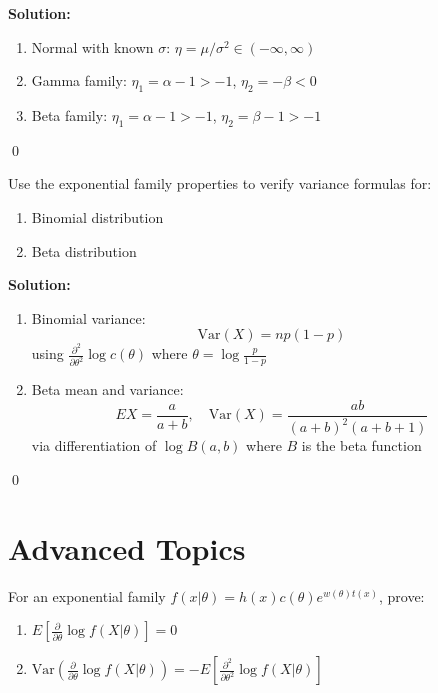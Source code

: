 \noindent\textbf{Solution:}
\begin{enumerate}[label=(\alph*)]
\item Normal with known $\sigma$: $\eta = \mu/\sigma^2 \in (-\infty,\infty)$
\item Gamma family: $\eta_1 = \alpha-1 > -1$, $\eta_2 = -\beta < 0$
\item Beta family: $\eta_1 = \alpha-1 > -1$, $\eta_2 = \beta-1 > -1$
\end{enumerate}


\qed
\begin{problembox}
Use the exponential family properties to verify variance formulas for:
\begin{enumerate}[label=(\alph*)]
\item Binomial distribution
\item Beta distribution
\end{enumerate}
\end{problembox}

\noindent\textbf{Solution:}
\begin{enumerate}[label=(\alph*)]
\item Binomial variance:
\[ \text{Var}(X) = np(1-p) \]
using $\frac{\partial^2}{\partial\theta^2}\log c(\theta)$ where $\theta = \log\frac{p}{1-p}$

\item Beta mean and variance:
\[ EX = \frac{a}{a+b}, \quad \text{Var}(X) = \frac{ab}{(a+b)^2(a+b+1)} \]
via differentiation of $\log B(a,b)$ where $B$ is the beta function
\end{enumerate}


\qed
\section{Advanced Topics}

\begin{problembox}
For an exponential family $f(x|\theta) = h(x)c(\theta)e^{w(\theta)t(x)}$, prove:
\begin{enumerate}[label=(\alph*)]
\item $E\left[\frac{\partial}{\partial\theta}\log f(X|\theta)\right] = 0$
\item $\text{Var}\left(\frac{\partial}{\partial\theta}\log f(X|\theta)\right) = -E\left[\frac{\partial^2}{\partial\theta^2}\log f(X|\theta)\right]$
\end{enumerate}
\end{problembox}

